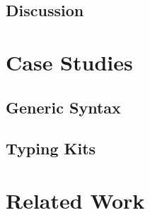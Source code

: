 \documentclass[screen,nonacm]{acmart}
\begin{document}
\subsection{Discussion}

\section{Case Studies}\label{sec:ext}
\subsection{Generic Syntax}\label{sec:ext-uni}

\subsection{Typing Kits}\label{sec:ext-tyk}

% 

\section{Related Work}\label{sec:rel}

\end{document}
